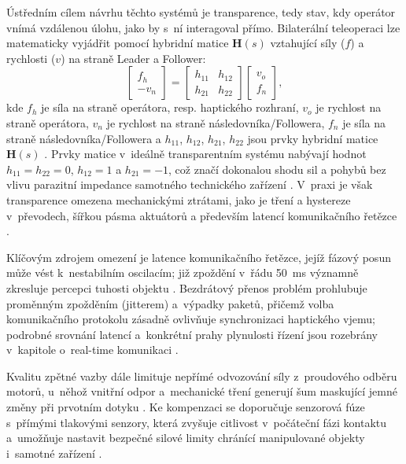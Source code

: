 \documentclass[FZS,DP]{tulthesis}
\begin{document}
Ústředním cílem návrhu těchto systémů je transparence, tedy stav, kdy operátor vnímá vzdálenou úlohu, jako by s~ní interagoval přímo.
Bilaterální teleoperaci lze matematicky vyjádřit pomocí hybridní matice $\mathbf{H}(s)$ vztahující síly ($f$) a rychlosti ($v$) na straně Leader a Follower:
%
\begin{equation}
    \begin{bmatrix} f_h \\ -v_n \end{bmatrix} =
    \begin{bmatrix} h_{11} & h_{12} \\ h_{21} & h_{22} \end{bmatrix}
    \begin{bmatrix} v_o \\ f_n \end{bmatrix},
\end{equation}
kde $f_h$ je síla na straně operátora, resp. haptického rozhraní,
$v_o$ je rychlost na straně operátora, $v_n$ je rychlost na straně
následovníka/Followera, $f_n$ je síla na straně následovníka/Followera
a $h_{11}$, $h_{12}$, $h_{21}$, $h_{22}$ jsou prvky hybridní matice
$\mathbf{H}(s)$ \cite{Black2025,Almeida202098}.
Prvky matice v~ideálně transparentním systému nabývají hodnot $h_{11} = h_{22} = 0$, $h_{12} = 1$ a $h_{21} = -1$, což značí dokonalou shodu sil a pohybů bez vlivu parazitní impedance samotného technického zařízení \cite{Black2025, Almeida202098}.
V~praxi je však transparence omezena mechanickými ztrátami, jako je tření a hystereze v~převodech, šířkou pásma aktuátorů a především latencí komunikačního řetězce \cite{Patel2022, Black2025}.

Klíčovým zdrojem omezení je latence komunikačního řetězce, jejíž fázový posun může vést k~nestabilním oscilacím; již zpoždění v~řádu 50~ms významně zkresluje percepci tuhosti objektu \cite{Patel2022}. Bezdrátový přenos problém prohlubuje proměnným zpožděním (jitterem) a~výpadky paketů, přičemž volba komunikačního protokolu zásadně ovlivňuje synchronizaci haptického vjemu; podrobné srovnání latencí a~konkrétní prahy plynulosti řízení jsou rozebrány v~kapitole o~real-time komunikaci \cite{Suman2025, Eridani2021918}.

Kvalitu zpětné vazby dále limituje nepřímé odvozování síly z~proudového odběru motorů, u~něhož vnitřní odpor a~mechanické tření generují šum maskující jemné změny při prvotním dotyku \cite{Patel2022, Mohammadi2024418}. Ke kompenzaci se doporučuje senzorová fúze s~přímými tlakovými senzory, která zvyšuje citlivost v~počáteční fázi kontaktu a~umožňuje nastavit bezpečné silové limity chránící manipulované objekty i~samotné zařízení \cite{Lebosse2011, Mohammadi2024418}.
\end{document}
